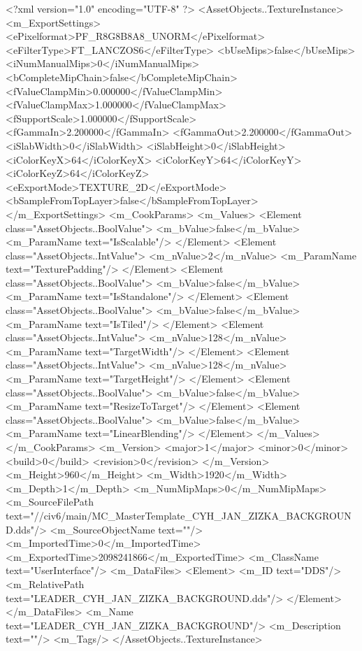 <?xml version="1.0" encoding="UTF-8" ?>
<AssetObjects..TextureInstance>
	<m_ExportSettings>
		<ePixelformat>PF_R8G8B8A8_UNORM</ePixelformat>
		<eFilterType>FT_LANCZOS6</eFilterType>
		<bUseMips>false</bUseMips>
		<iNumManualMips>0</iNumManualMips>
		<bCompleteMipChain>false</bCompleteMipChain>
		<fValueClampMin>0.000000</fValueClampMin>
		<fValueClampMax>1.000000</fValueClampMax>
		<fSupportScale>1.000000</fSupportScale>
		<fGammaIn>2.200000</fGammaIn>
		<fGammaOut>2.200000</fGammaOut>
		<iSlabWidth>0</iSlabWidth>
		<iSlabHeight>0</iSlabHeight>
		<iColorKeyX>64</iColorKeyX>
		<iColorKeyY>64</iColorKeyY>
		<iColorKeyZ>64</iColorKeyZ>
		<eExportMode>TEXTURE_2D</eExportMode>
		<bSampleFromTopLayer>false</bSampleFromTopLayer>
	</m_ExportSettings>
	<m_CookParams>
		<m_Values>
			<Element class="AssetObjects..BoolValue">
				<m_bValue>false</m_bValue>
				<m_ParamName text="IsScalable"/>
			</Element>
			<Element class="AssetObjects..IntValue">
				<m_nValue>2</m_nValue>
				<m_ParamName text="TexturePadding"/>
			</Element>
			<Element class="AssetObjects..BoolValue">
				<m_bValue>false</m_bValue>
				<m_ParamName text="IsStandalone"/>
			</Element>
			<Element class="AssetObjects..BoolValue">
				<m_bValue>false</m_bValue>
				<m_ParamName text="IsTiled"/>
			</Element>
			<Element class="AssetObjects..IntValue">
				<m_nValue>128</m_nValue>
				<m_ParamName text="TargetWidth"/>
			</Element>
			<Element class="AssetObjects..IntValue">
				<m_nValue>128</m_nValue>
				<m_ParamName text="TargetHeight"/>
			</Element>
			<Element class="AssetObjects..BoolValue">
				<m_bValue>false</m_bValue>
				<m_ParamName text="ResizeToTarget"/>
			</Element>
			<Element class="AssetObjects..BoolValue">
				<m_bValue>false</m_bValue>
				<m_ParamName text="LinearBlending"/>
			</Element>
		</m_Values>
	</m_CookParams>
	<m_Version>
		<major>1</major>
		<minor>0</minor>
		<build>0</build>
		<revision>0</revision>
	</m_Version>
	<m_Height>960</m_Height>
	<m_Width>1920</m_Width>
	<m_Depth>1</m_Depth>
	<m_NumMipMaps>0</m_NumMipMaps>
	<m_SourceFilePath text="//civ6/main/MC_MasterTemplate\Textures\LEADER_CYH_JAN_ZIZKA_BACKGROUND.dds"/>
	<m_SourceObjectName text=""/>
	<m_ImportedTime>0</m_ImportedTime>
	<m_ExportedTime>2098241866</m_ExportedTime>
	<m_ClassName text="UserInterface"/>
	<m_DataFiles>
		<Element>
			<m_ID text="DDS"/>
			<m_RelativePath text="LEADER_CYH_JAN_ZIZKA_BACKGROUND.dds"/>
		</Element>
	</m_DataFiles>
	<m_Name text="LEADER_CYH_JAN_ZIZKA_BACKGROUND"/>
	<m_Description text=""/>
	<m_Tags/>
</AssetObjects..TextureInstance>

